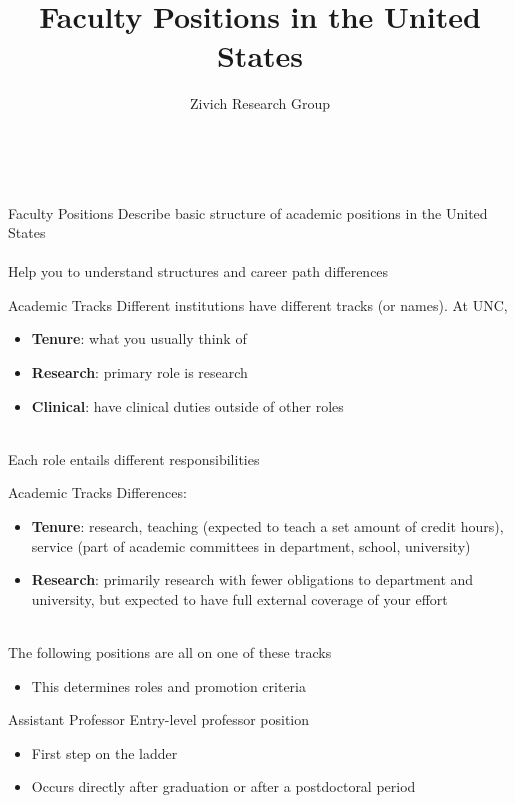 \documentclass[aspectratio=169]{beamer}
\title[Academia]{Faculty Positions in the United States}
\author[Paul Zivich]{Zivich Research Group}
\date{~}
\begin{document}
\maketitle

\begin{frame}{Faculty Positions}
	Describe basic structure of academic positions in the United States
	~\\~\\
	Help you to understand structures and career path differences
\end{frame}

\begin{frame}{Academic Tracks}
	Different institutions have different tracks (or names). At UNC,
	\begin{itemize}
		\item \textbf{Tenure}: what you usually think of
		\item \textbf{Research}: primary role is research
		\item \textbf{Clinical}: have clinical duties outside of other roles
	\end{itemize}
	~\\
	Each role entails different responsibilities
\end{frame}

\begin{frame}{Academic Tracks}
	Differences:
	\begin{itemize}
		\item \textbf{Tenure}: research, teaching (expected to teach a set amount of credit hours), service (part of academic committees in department, school, university)
		\item \textbf{Research}: primarily research with fewer obligations to department and university, but expected to have full external coverage of your effort
	\end{itemize}
	~\\
	The following positions are all on one of these tracks
	\begin{itemize}
		\item This determines roles and promotion criteria
	\end{itemize}
\end{frame}

\begin{frame}{Assistant Professor}
	Entry-level professor position
	\begin{itemize}
		\item First step on the ladder
		\item Occurs directly after graduation or after a postdoctoral period
	\end{itemize}
\end{frame}
\end{document}
